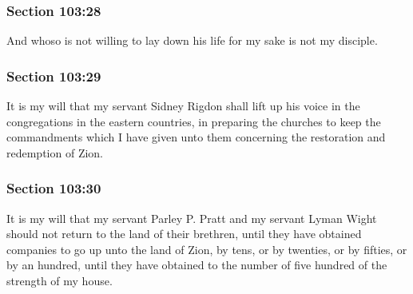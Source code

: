 	\subsubsection{Section 103:28} %
		\label{DC103-28}

		And whoso is not willing to lay down his life for my sake is not my disciple.


	\subsubsection{Section 103:29} %
		\label{DC103-29}

		It is my will that my servant Sidney Rigdon shall lift up his voice in the congregations in the eastern countries, in preparing the churches to keep the commandments which I have given unto them concerning the restoration and redemption of Zion.


	\subsubsection{Section 103:30} %
		\label{DC103-30}

		It is my will that my servant Parley P. Pratt and my servant Lyman Wight should not return to the land of their brethren, until they have obtained companies to go up unto the land of Zion, by tens, or by twenties, or by fifties, or by an hundred, until they have obtained to the number of five hundred of the strength of my house.



